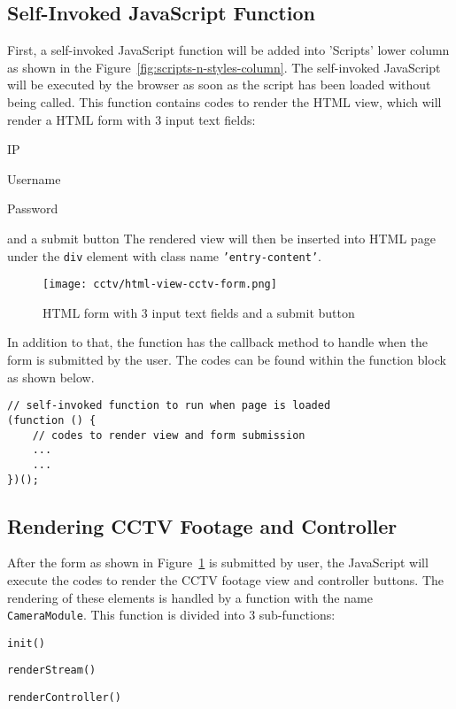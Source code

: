\subsection{Self-Invoked JavaScript Function}
First, a self-invoked JavaScript function will be added into 'Scripts' lower column as shown in the Figure~\ref{fig:scripts-n-styles-column}. The self-invoked JavaScript will be executed by the browser as soon as the script has been loaded without being called. This function contains codes to render the HTML view, which will render a HTML form with 3 input text fields:
\begin{itemize*}
\item IP
\item Username
\item Password
\end{itemize*}
and a submit button The rendered view will then be inserted into HTML page under the \texttt{div} element with class name \texttt{'entry-content'}.

\begin{figure}[ht]
\caption{HTML form with 3 input text fields and a submit button}
\label{fig:html-view-cctv-form}
\centering
\texttt{[image: cctv/html-view-cctv-form.png]}
\end{figure}

In addition to that, the function has the callback method to handle when the form is submitted by the user. The codes can be found within the function block as shown below.
\begin{lstlisting}
// self-invoked function to run when page is loaded
(function () {
	// codes to render view and form submission
	...
	...
})();
\end{lstlisting}

\subsection{Rendering CCTV Footage and Controller} \label{sec:cctv-rendering-camera-module}
After the form as shown in Figure~\ref{fig:html-view-cctv-form} is submitted by user, the JavaScript will execute the codes to render the CCTV footage view and controller buttons. The rendering of these elements is handled by a function with the name \texttt{CameraModule}. This function is divided into 3 sub-functions:
\begin{itemize*}
\item \texttt{init()}
\item \texttt{renderStream()}
\item \texttt{renderController()}
\end{itemize*}

